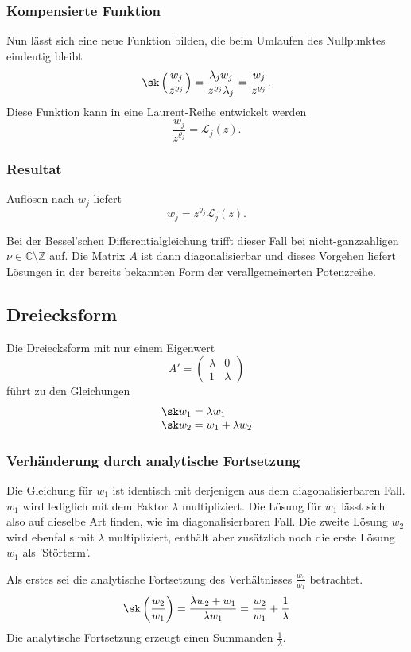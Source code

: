 \subsubsection{Kompensierte Funktion}
Nun lässt sich eine neue Funktion bilden, die beim Umlaufen des Nullpunktes eindeutig bleibt
\[
\sk \left(\frac{w_j}{z^{\varrho_j}}\right) 
= \frac{\lambda_j w_j}{z^{\varrho_j}\lambda_j}
= \frac{w_j}{z^{\varrho_j}}.
\]
Diese Funktion kann in eine Laurent-Reihe entwickelt werden
\[\frac{w_j}{z^{\varrho_j}} = \mathcal{L}_j(z).\]

\subsubsection{Resultat}
Auflösen nach $w_j$ liefert 
\[ w_j = z^{\varrho_j}\mathcal{L}_j(z).\]

Bei der Bessel'schen Differentialgleichung trifft dieser Fall bei nicht-ganzzahligen $\nu\in\mathbb{C}\setminus\mathbb{Z}$ auf.
Die Matrix $A$ ist dann diagonalisierbar und dieses Vorgehen liefert Lösungen in der bereits bekannten Form der verallgemeinerten Potenzreihe.


\subsection{Dreiecksform}
Die Dreiecksform mit nur einem Eigenwert 
\[A'=\begin{pmatrix}\lambda & 0 \\ 1 & \lambda \end{pmatrix}\]
führt zu den Gleichungen
\[
\begin{array}{l}
\sk w_1 = \lambda w_1 \\
\sk w_2 = w_1 + \lambda w_2
\end{array}
\]

\subsubsection{Verhänderung durch analytische Fortsetzung}
Die Gleichung für $w_1$ ist identisch mit derjenigen aus dem diagonalisierbaren Fall.
$w_1$ wird lediglich mit dem Faktor $\lambda$ multipliziert.
Die Lösung für $w_1$ lässt sich also auf dieselbe Art finden, wie im diagonalisierbaren Fall.
Die zweite Lösung $w_2$ wird ebenfalls mit $\lambda$ multipliziert, enthält aber zusätzlich noch die erste Lösung $w_1$ als 'Störterm'.

Als erstes sei die analytische Fortsetzung des Verhältnisses $\frac{w_2}{w_1}$ betrachtet.
\[\sk \left(\frac{w_2}{w_1}\right)
= \frac{\lambda w_2+w_1}{\lambda w_1} 
= \frac{w_2}{w_1} + \frac{1}{\lambda}\]
Die analytische Fortsetzung erzeugt einen Summanden $\frac{1}{\lambda}$.

